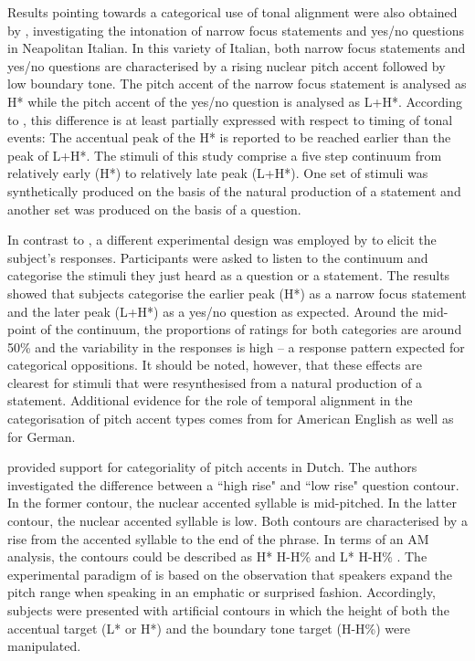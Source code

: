 Results pointing towards a categorical use of tonal alignment were also obtained by \citet{DImperioHouse1997}, investigating the intonation of narrow focus statements and yes/no questions in Neapolitan Italian. In this variety of Italian, both narrow focus statements and yes/no questions are characterised by a rising nuclear pitch accent followed by low boundary tone. The pitch accent of the narrow focus statement is analysed as H* while the pitch accent of the yes/no question is analysed as L+H*. According to \citet{DImperioHouse1997}, this difference is at least partially expressed with respect to timing of tonal events: The accentual peak of the H* is reported to be reached earlier than the peak of L+H*. The stimuli of this study comprise a five step continuum from relatively early (H*) to relatively late peak (L+H*). One set of stimuli was synthetically produced on the basis of the natural production of a statement and another set was produced on the basis of a question.

In contrast to \citet{PierrehumbertSteele1989}, a different experimental design was employed by \citet{DImperioHouse1997} to elicit the subject's responses. Participants were asked to listen to the continuum and categorise the stimuli they just heard as a question or a statement. The results showed that subjects categorise the earlier peak (H*) as a narrow focus statement and the later peak (L+H*) as a yes/no question as expected. Around the mid-point of the continuum, the proportions of ratings for both categories are around 50\% and the variability in the responses is high -- a response pattern expected for categorical oppositions. It should be noted, however, that these effects are clearest for stimuli that were resynthesised from a natural production of a statement. Additional evidence for the role of temporal alignment in the categorisation of pitch accent types comes from \citet{DilleyHeffner2013} for American English as well as \citet{Kohler1987} for German.

\citet{GussenhovenRietveld2000} provided support for categoriality of pitch accents in Dutch. The authors investigated the difference between a ``high rise" and ``low rise" question contour. In the former contour, the nuclear accented syllable is mid-pitched. In the latter contour, the nuclear accented syllable is low. Both contours are characterised by a rise from the accented syllable to the end of the phrase. In terms of an AM analysis, the contours could be described as H* H-H\% and L* H-H\% \citep{Gussenhoven2004}. The experimental paradigm of \citet{GussenhovenRietveld2000} is based on the observation that speakers expand the pitch range when speaking in an emphatic or surprised fashion. Accordingly, subjects were presented with artificial contours in which the height of both the accentual target (L* or H*) and the boundary tone target (H-H\%) were manipulated. 

